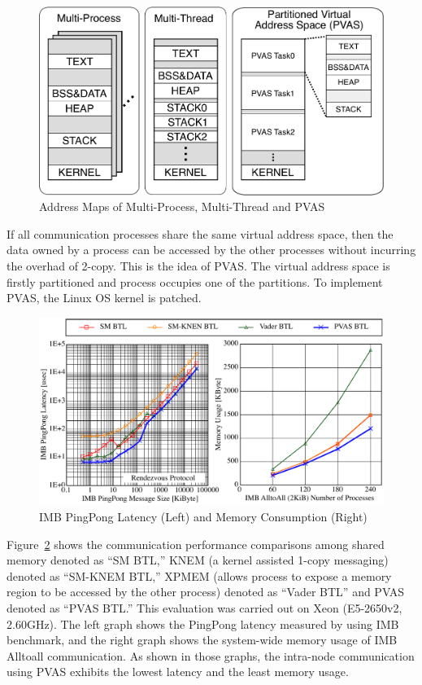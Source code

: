 \begin{figure}[ht]
\begin{center}
\includegraphics[width=0.8\columnwidth]{Figs/PVAS.pdf}
  \caption{Address Maps of Multi-Process, Multi-Thread and PVAS}
  \label{fig:pvas-map}
\end{center}
\end{figure}

If all communication processes share the same virtual address space,
then the data owned by a process can be accessed by the other
processes without incurring the overhad of 2-copy. This is the idea of
PVAS\cite{110009850784,Shimada:2014:ECC:2642769.2642790,SHIMADA:PGAS12,Shimada:2013:PNT:2489068.2489075,shimada-thesis}. The
virtual address space is  
firstly partitioned and process occupies one of the partitions. To
implement PVAS, the Linux OS kernel is patched. 

\begin{figure}[ht]
\begin{center}
\includegraphics[width=0.95\columnwidth]{Figs/PVAS-BTL.pdf}
  \caption{IMB PingPong Latency (Left) and Memory Consumption (Right)}
  \label{fig:pvas-btl}
\end{center}
\end{figure}

Figure~\ref{fig:pvas-btl} shows the communication performance
comparisons among shared memory denoted as ``SM BTL,'' KNEM (a kernel
assisted 1-copy messaging) denoted as ``SM-KNEM BTL,'' XPMEM (allows
process to expose a memory region to be accessed by the other process)
denoted as ``Vader BTL'' and PVAS denoted as ``PVAS BTL.'' This
evaluation was carried out on Xeon (E5-2650v2, 2.60GHz). The left
graph shows the PingPong latency measured by using IMB benchmark, and
the right graph shows the system-wide memory usage of IMB Alltoall
communication. As shown in those graphs, the intra-node communication
using PVAS exhibits the lowest latency and the least memory usage.

